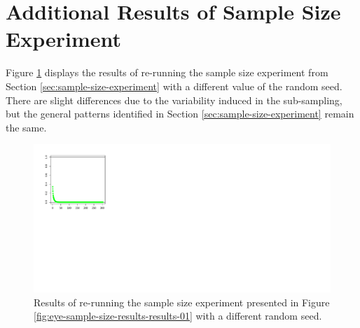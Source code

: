 \section{Additional Results of Sample Size Experiment}\label{sec:additional-results}

Figure \ref{fig:eye-sample-size-results-results-02} displays the results of re-running the sample size experiment from Section \ref{sec:sample-size-experiment} with a different value of the random seed.
There are slight differences due to the variability induced in the sub-sampling, but the general patterns identified in Section \ref{sec:sample-size-experiment} remain the same.

\begin{figure}
    \centering
    \includegraphics[width=1\linewidth]{figures/eye-sample-size-results-results-real-02.pdf}
    \caption{Results of re-running the sample size experiment presented in Figure \ref{fig:eye-sample-size-results-results-01} with a different random seed.}
    \label{fig:eye-sample-size-results-results-02}
\end{figure}